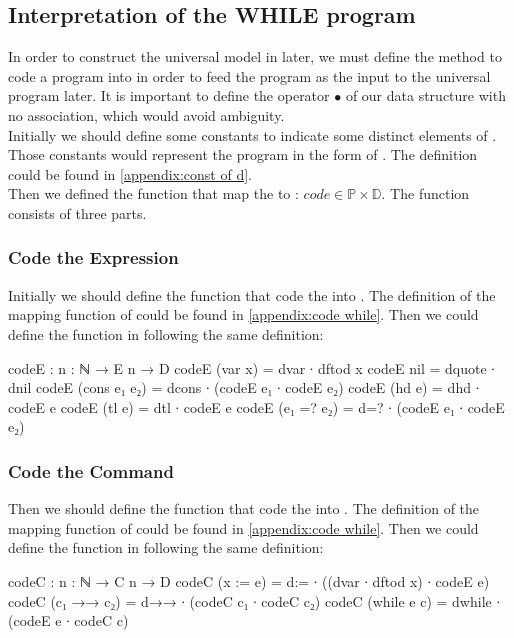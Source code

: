 \subsection{Interpretation of the WHILE program}\label{definition: code}
In order to construct the universal \WHILE model in \Agda later, we must define the method to code a program into  in order to feed the program as the input to the universal \WHILE program later.
It is important to define the operator $\bullet$ of our data structure  with no association, which would avoid ambiguity.\\
Initially we should define some constants to indicate some distinct elements of .
Those constants would represent the program in the form of .
The definition could be found in \ref{appendix:const of d}.\\
Then we defined the function that map the  to : $code \in \mathds{P} \times \mathds{D}$.
The  function consists of three parts.
\subsubsection{Code the Expression}
Initially we should define the function that code the  into .
The definition of the mapping function of  could be found in \ref{appendix:code while}.
Then we could define the function in \Agda following the same definition:
\begin{code}
codeE : {n : ℕ} → E n → D
codeE (var x) = dvar ∙ dftod x
codeE nil = dquote ∙ dnil
codeE (cons e₁ e₂) = dcons ∙ (codeE e₁ ∙ codeE e₂)
codeE (hd e) = dhd ∙ codeE e
codeE (tl e) = dtl ∙ codeE e
codeE (e₁ =? e₂) = d=? ∙ (codeE e₁ ∙ codeE e₂)
\end{code}
\subsubsection{Code the Command}
Then we should define the function that code the  into .
The definition of the mapping function of  could be found in \ref{appendix:code while}.
Then we could define the function in \Agda following the same definition:
\begin{code}
codeC : {n : ℕ} → C n → D
codeC (x := e) = d:= ∙ ((dvar ∙ dftod x) ∙ codeE e)
codeC (c₁ →→ c₂) = d→→ ∙ (codeC c₁ ∙ codeC c₂)
codeC (while e c) = dwhile ∙ (codeE e ∙ codeC c)
\end{code}
